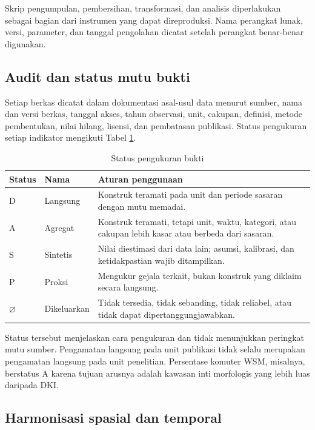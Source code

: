 \documentclass[12pt,a4paper,oneside,openany,indonesian]{report}
\begin{document}
Skrip pengumpulan, pembersihan, transformasi, dan analisis diperlakukan
sebagai bagian dari instrumen yang dapat direproduksi. Nama perangkat
lunak, versi, parameter, dan tanggal pengolahan dicatat setelah
perangkat benar-benar digunakan.

\subsection{Audit dan status mutu
bukti}\label{audit-dan-status-mutu-bukti}

Setiap berkas dicatat dalam dokumentasi asal-usul data menurut sumber,
nama dan versi berkas, tanggal akses, tahun observasi, unit, cakupan,
definisi, metode pembentukan, nilai hilang, lisensi, dan pembatasan
publikasi. Status pengukuran setiap indikator mengikuti Tabel
\ref{tab:bab3-status}.

\begin{table}[H]
\centering
\footnotesize
\caption{Status pengukuran bukti}\label{tab:bab3-status}
\begin{tabularx}{\textwidth}{>{\centering\arraybackslash}p{} >{\raggedright\arraybackslash}p{} X}
\toprule
Status & Nama & Aturan penggunaan \\
\midrule
D & Langsung & Konstruk teramati pada unit dan periode sasaran dengan mutu memadai. \\
A & Agregat & Konstruk teramati, tetapi unit, waktu, kategori, atau cakupan lebih kasar atau berbeda dari sasaran. \\
S & Sintetis & Nilai diestimasi dari data lain; asumsi, kalibrasi, dan ketidakpastian wajib ditampilkan. \\
P & Proksi & Mengukur gejala terkait, bukan konstruk yang diklaim secara langsung. \\
$\varnothing$ & Dikeluarkan & Tidak tersedia, tidak sebanding, tidak reliabel, atau tidak dapat dipertanggungjawabkan. \\
\bottomrule
\end{tabularx}
\end{table}

Status tersebut menjelaskan cara pengukuran dan tidak menunjukkan
peringkat mutu sumber. Pengamatan langsung pada unit publikasi tidak selalu merupakan
pengamatan langsung pada unit penelitian. Persentase komuter WSM,
misalnya, berstatus A karena tujuan arusnya adalah kawasan inti
morfologis yang lebih luas daripada DKI.

\subsection{Harmonisasi spasial dan
temporal}\label{harmonisasi-spasial-dan-temporal}
\end{document}
